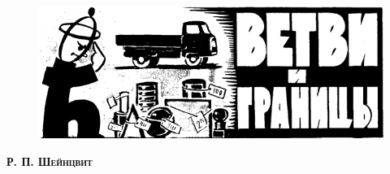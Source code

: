 \documentclass[12pt,twoside]{article}
\begin{document}
\pagestyle{fancy}
\fancyfoot{}
\fancyfoot[LO,RE]{\thepage}
\begin{figure}
    \includegraphics[width=1\linewidth]{main_task/pic_title.png}
\end{figure}
\begin{flushright}
    \Large{\textsc{\textbf{Р. П. Шейнцвит}}}
\end{flushright}
\end{document}
